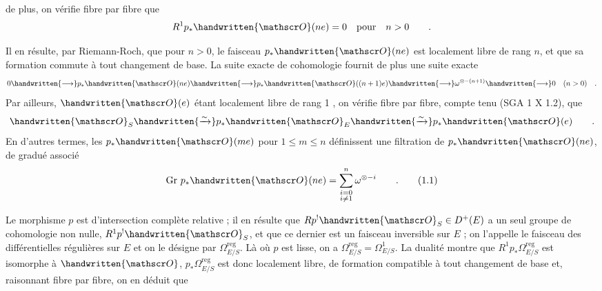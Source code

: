 de plus, on vérifie fibre par fibre que
\[
R^1p_*\handwritten{\mathscr O}(ne)=0\quad\text{pour}\quad n>0\qquad .
\]

Il en résulte, par Riemann-Roch, que pour $n>0$, le faisceau $p_*\handwritten{\mathscr O}(ne)$ est localement libre de rang $n$, et que sa formation commute à tout changement de base. La suite exacte de cohomologie fournit de plus une suite exacte
\[
0\handwritten{\longrightarrow}p_*\handwritten{\mathscr O}(ne)\handwritten{\longrightarrow}
p_*\handwritten{\mathscr O}((n+1)e)\handwritten{\longrightarrow}\omega^{\otimes-(n+1)}
\handwritten{\longrightarrow}0\quad(n>0)\quad .
\]
Par ailleurs, $\handwritten{\mathscr O}(e)$ étant localement libre de rang 1 , on vérifie fibre par fibre, compte tenu  (SGA 1 X 1.2), que
\[
\handwritten{\mathscr O}_S\handwritten{\xrightarrow{\sim}}p_*\handwritten{\mathscr O}_E
\handwritten{\xrightarrow{\sim}}p_*\handwritten{\mathscr O}(e)\qquad .
\]
En d'autres termes, les $p_*\handwritten{\mathscr O}(me)$ pour $1\leq m\leq n$ définissent une filtration de $p_*\handwritten{\mathscr O}(ne)$, de gradué associé
\[
\mathrm{Gr}\ p_*\handwritten{\mathscr O}(ne)=\sum_{\substack{i=0\\i\ne1}}^n\omega^{\otimes-i}\qquad .\tag*{(1.1)}
\]

Le morphisme $p$ est d'intersection complète relative ; il en résulte que $Rp^!\handwritten{\mathscr O}_S\in D^+(E)$  a un seul groupe de cohomologie non nulle, $R^1p^!\handwritten{\mathscr O}_S$, et que ce dernier est un faisceau inversible sur $E$ ; on l'appelle le faisceau des différentielles régulières sur $E$ et on le désigne par $\Omega^{\mathrm{reg}}_{E/S}$. Là où $p$ est lisse, on a $\Omega^{\mathrm{reg}}_{E/S}=\Omega^1_{E/S}$. La dualité montre que $R^1p_*\Omega^{\mathrm{reg}}_{E/S}$ est isomorphe à $\handwritten{\mathscr O}$, $p_*\Omega^{\mathrm{reg}}_{E/S}$ est donc localement libre, de formation compatible à tout changement de base et, raisonnant fibre par fibre, on en déduit que

